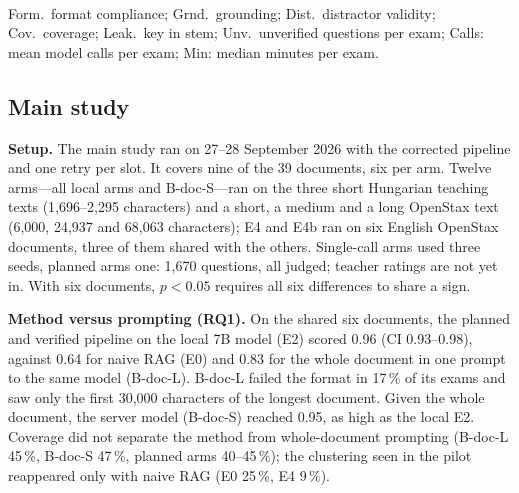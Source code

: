 \documentclass[conference]{IEEEtran}
\begin{document}
\begin{table}[t]
\centering
\caption{Main study. Index: quality index (mean of document means) with 95\,\% bootstrap CI; rates in
\%. All arms but E4 and E4b ran on the same six documents (3 HU, 3 EN); E4 and E4b on six EN
documents, three of them shared with the others.}
\label{tab:main}
\scriptsize
\setlength{\tabcolsep}{1.5pt}

\\[2pt]{\scriptsize Form.\ format compliance; Grnd.\ grounding; Dist.\ distractor validity; Cov.\ coverage;
Leak.\ key in stem; Unv.\ unverified questions per exam; Calls: mean model calls per exam; Min: median
minutes per exam.}
\end{table}

\subsection{Main study}

\textbf{Setup.} The main study ran on 27--28 September 2026 with the corrected pipeline and one retry
per slot. It covers nine of the 39 documents, six per arm. Twelve arms---all local arms and B-doc-S---ran
on the three short Hungarian teaching texts (1{,}696--2{,}295 characters) and a short, a medium and a long
OpenStax text (6{,}000, 24{,}937 and 68{,}063 characters); E4 and E4b ran on six English OpenStax
documents, three of them shared with the others. Single-call arms used three seeds, planned arms one:
1{,}670 questions, all judged; teacher ratings are not yet in. With six documents, $p<0.05$ requires all
six differences to share a sign.

\textbf{Method versus prompting (RQ1).} On the shared six documents, the planned and verified pipeline on
the local 7B model (E2) scored 0.96 (CI 0.93--0.98), against 0.64 for naive RAG (E0) and 0.83 for the whole
document in one prompt to the same model (B-doc-L). B-doc-L failed the format in 17\,\% of its exams and saw
only the first 30{,}000 characters of the longest document. Given the whole document, the server model (B-doc-S) reached 0.95, as high as the
local E2. Coverage did not separate the method from whole-document prompting (B-doc-L 45\,\%, B-doc-S
47\,\%, planned arms 40--45\,\%); the clustering seen in the pilot reappeared only with naive RAG (E0
25\,\%, E4 9\,\%).

\begin{table}[t]
\centering
\caption{Main study: paired Wilcoxon tests on the per-document quality index. $n$: shared documents;
$r$: rank-biserial effect size ($r>0$: new arm better); $p$ Holm-adjusted over the six comparisons.}
\label{tab:sig}
\footnotesize

\end{table}
\end{document}
